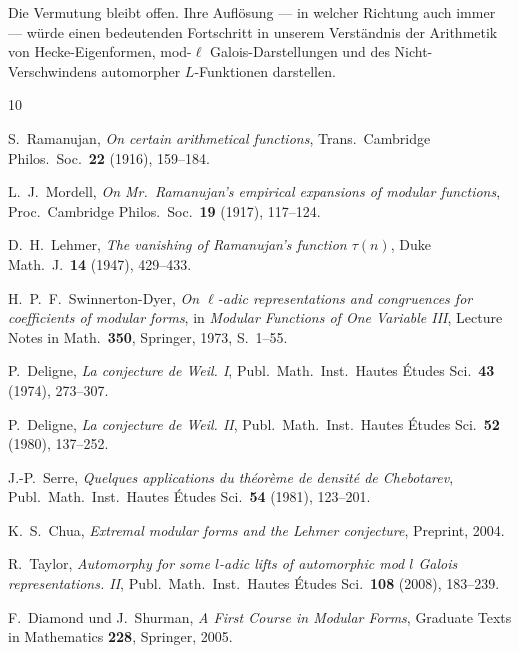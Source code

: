 \documentclass[12pt,a4paper]{amsart}
\theoremstyle{definition}
\begin{document}
Die Vermutung bleibt offen. Ihre Auflösung --- in welcher Richtung auch immer ---
würde einen bedeutenden Fortschritt in unserem Verständnis der Arithmetik von
Hecke-Eigenformen, mod-$\ell$ Galois-Darstellungen und des Nicht-Verschwindens
automorpher $L$-Funktionen darstellen.

\begin{thebibliography}{10}

S.~Ramanujan,
\textit{On certain arithmetical functions},
Trans.\ Cambridge Philos.\ Soc.\ \textbf{22} (1916), 159--184.

L.~J.~Mordell,
\textit{On Mr.\ Ramanujan's empirical expansions of modular functions},
Proc.\ Cambridge Philos.\ Soc.\ \textbf{19} (1917), 117--124.

D.~H.~Lehmer,
\textit{The vanishing of Ramanujan's function $\tau(n)$},
Duke Math.\ J.\ \textbf{14} (1947), 429--433.

H.~P.~F.~Swinnerton-Dyer,
\textit{On $\ell$-adic representations and congruences for coefficients of modular
forms},
in \textit{Modular Functions of One Variable III}, Lecture Notes in Math.\ \textbf{350},
Springer, 1973, S.\ 1--55.

P.~Deligne,
\textit{La conjecture de Weil. I},
Publ.\ Math.\ Inst.\ Hautes \'Etudes Sci.\ \textbf{43} (1974), 273--307.

P.~Deligne,
\textit{La conjecture de Weil. II},
Publ.\ Math.\ Inst.\ Hautes \'Etudes Sci.\ \textbf{52} (1980), 137--252.

J.-P.~Serre,
\textit{Quelques applications du th\'eor\`eme de densit\'e de Chebotarev},
Publ.\ Math.\ Inst.\ Hautes \'Etudes Sci.\ \textbf{54} (1981), 123--201.

K.~S.~Chua,
\textit{Extremal modular forms and the Lehmer conjecture},
Preprint, 2004.

R.~Taylor,
\textit{Automorphy for some $l$-adic lifts of automorphic mod $l$ Galois
representations. II},
Publ.\ Math.\ Inst.\ Hautes \'Etudes Sci.\ \textbf{108} (2008), 183--239.

F.~Diamond und J.~Shurman,
\textit{A First Course in Modular Forms},
Graduate Texts in Mathematics \textbf{228}, Springer, 2005.

\end{thebibliography}
\end{document}
